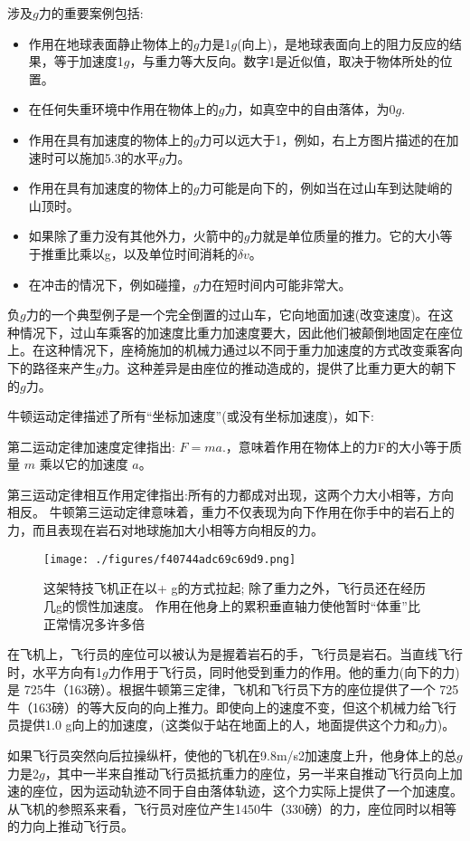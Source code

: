 涉及$g$力的重要案例包括:
\begin{itemize}
\item 作用在地球表面静止物体上的$g$力是1$g$(向上)，是地球表面向上的阻力反应的结果，等于加速度1$g$，与重力等大反向。数字1是近似值，取决于物体所处的位置。
\item 在任何失重环境中作用在物体上的$g$力，如真空中的自由落体，为0$g$.
\item 作用在具有加速度的物体上的$g$力可以远大于1，例如，右上方图片描述的在加速时可以施加5.3的水平$g$力。
\item 作用在具有加速度的物体上的$g$力可能是向下的，例如当在过山车到达陡峭的山顶时。
\item 如果除了重力没有其他外力，火箭中的$g$力就是单位质量的推力。它的大小等于推重比乘以g，以及单位时间消耗的$\delta v$。
\item 在冲击的情况下，例如碰撞，$g$力在短时间内可能非常大。
\end{itemize}
负$g$力的一个典型例子是一个完全倒置的过山车，它向地面加速(改变速度)。在这种情况下，过山车乘客的加速度比重力加速度要大，因此他们被颠倒地固定在座位上。在这种情况下，座椅施加的机械力通过以不同于重力加速度的方式改变乘客向下的路径来产生$g$力。这种差异是由座位的推动造成的，提供了比重力更大的朝下的$g$力。

牛顿运动定律描述了所有“坐标加速度”(或没有坐标加速度)，如下:

第二运动定律加速度定律指出: $F = ma$.，意味着作用在物体上的力F的大小等于质量 $m$ 乘以它的加速度 $a$。

第三运动定律相互作用定律指出:所有的力都成对出现，这两个力大小相等，方向相反。 牛顿第三运动定律意味着，重力不仅表现为向下作用在你手中的岩石上的力，而且表现在岩石对地球施加大小相等方向相反的力。
\begin{figure}[ht]
\centering
\texttt{[image: ./figures/f40744adc69c69d9.png]}
\caption{这架特技飞机正在以+ g的方式拉起; 除了重力之外，飞行员还在经历几g的惯性加速度。 作用在他身上的累积垂直轴力使他暂时“体重”比正常情况多许多倍} \label{fig_GLI_1}
\end{figure}
在飞机上，飞行员的座位可以被认为是握着岩石的手，飞行员是岩石。当直线飞行时，水平方向有1$g$力作用于飞行员，同时他受到重力的作用。他的重力(向下的力)是 725牛（163磅）。根据牛顿第三定律，飞机和飞行员下方的座位提供了一个 725牛（163磅）的等大反向的向上推力。即使向上的速度不变，但这个机械力给飞行员提供1.0 g向上的加速度，(这类似于站在地面上的人，地面提供这个力和$g$力)。

如果飞行员突然向后拉操纵杆，使他的飞机在9.8m/s2加速度上升，他身体上的总$g$力是2$g$，其中一半来自推动飞行员抵抗重力的座位，另一半来自推动飞行员向上加速的座位，因为运动轨迹不同于自由落体轨迹，这个力实际上提供了一个加速度。从飞机的参照系来看，飞行员对座位产生1450牛（330磅）的力，座位同时以相等的力向上推动飞行员。

